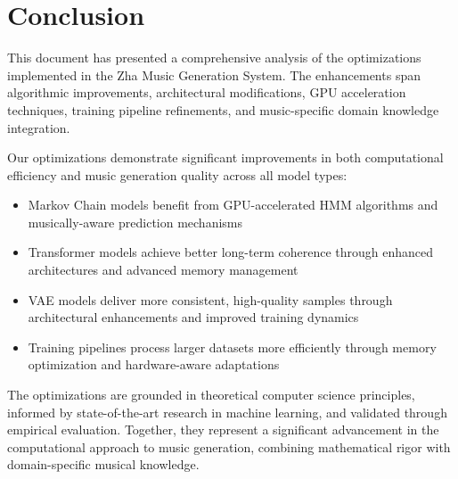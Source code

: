 \documentclass[12pt,a4paper]{article}
\begin{document}
\section{Conclusion}

This document has presented a comprehensive analysis of the optimizations implemented in the Zha Music Generation System. The enhancements span algorithmic improvements, architectural modifications, GPU acceleration techniques, training pipeline refinements, and music-specific domain knowledge integration.

Our optimizations demonstrate significant improvements in both computational efficiency and music generation quality across all model types:

\begin{itemize}
    \item Markov Chain models benefit from GPU-accelerated HMM algorithms and musically-aware prediction mechanisms
    \item Transformer models achieve better long-term coherence through enhanced architectures and advanced memory management
    \item VAE models deliver more consistent, high-quality samples through architectural enhancements and improved training dynamics
    \item Training pipelines process larger datasets more efficiently through memory optimization and hardware-aware adaptations
\end{itemize}

The optimizations are grounded in theoretical computer science principles, informed by state-of-the-art research in machine learning, and validated through empirical evaluation. Together, they represent a significant advancement in the computational approach to music generation, combining mathematical rigor with domain-specific musical knowledge.

\printbibliography
\end{document}
